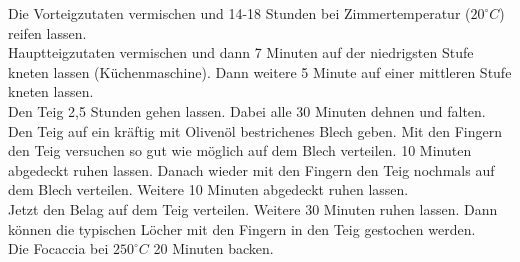 \begin{tcolorbox}
    Die Vorteigzutaten vermischen und 14-18 Stunden bei Zimmertemperatur ($20^\circ C$) reifen lassen.\\
    Hauptteigzutaten vermischen und dann 7 Minuten auf der niedrigsten Stufe kneten lassen (Küchenmaschine).
    Dann weitere 5 Minute auf einer mittleren Stufe kneten lassen.\\
    Den Teig 2,5 Stunden gehen lassen.
    Dabei alle 30 Minuten dehnen und falten.\\
    Den Teig auf ein kräftig mit Olivenöl bestrichenes Blech geben.
    Mit den Fingern den Teig versuchen so gut wie möglich auf dem Blech verteilen.
    10 Minuten abgedeckt ruhen lassen.
    Danach wieder mit den Fingern den Teig nochmals auf dem Blech verteilen.
    Weitere 10 Minuten abgedeckt ruhen lassen.\\
    Jetzt den Belag auf dem Teig verteilen.
    Weitere 30 Minuten ruhen lassen.
    Dann können die typischen  \glqq Löcher \grqq{} mit den Fingern in den Teig gestochen werden.\\
    Die Focaccia bei $250^\circ C$ 20 Minuten backen.
\end{tcolorbox}
\newpage

